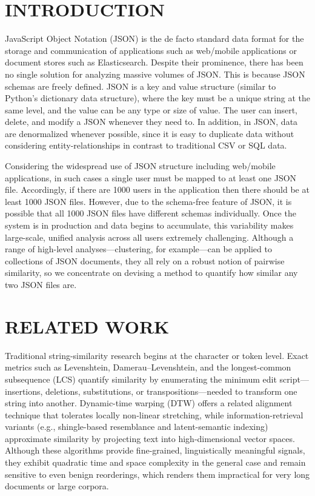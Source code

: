 \documentclass[sigconf]{acmart}
\begin{document}
\maketitle

\section{INTRODUCTION}

JavaScript Object Notation (JSON) is the de facto standard data format for the storage and communication of applications such as web/mobile applications or document stores such as Elasticsearch. Despite their prominence, there has been no single solution for analyzing massive volumes of JSON. This is because JSON schemas are freely defined. JSON is a key and value structure (similar to Python's dictionary data structure), where the key must be a unique string at the same level, and the value can be any type or size of value. The user can insert, delete, and modify a JSON whenever they need to. In addition, in JSON, data are denormalized whenever possible, since it is easy to duplicate data without considering entity-relationships in contrast to traditional CSV or SQL data. 

Considering the widespread use of JSON structure including web/mobile applications, in such cases a single user must be mapped to at least one JSON file. Accordingly, if there are 1000 users in the application then there should be at least 1000 JSON files. However, due to the schema-free feature of JSON, it is possible that all 1000 JSON files have different schemas individually. Once the system is in production and data begins to accumulate, this variability makes large-scale, unified analysis across all users extremely challenging. Although a range of high-level analyses—clustering, for example—can be applied to collections of JSON documents, they all rely on a robust notion of pairwise similarity, so we concentrate on devising a method to quantify how similar any two JSON files are.

\section{RELATED WORK}
Traditional string-similarity research begins at the character or token level. Exact metrics such as Levenshtein, Damerau–Levenshtein, and the longest-common subsequence (LCS) quantify similarity by enumerating the minimum edit script—insertions, deletions, substitutions, or transpositions—needed to transform one string into another. Dynamic-time warping (DTW) offers a related alignment technique that tolerates locally non-linear stretching, while information-retrieval variants (e.g., shingle-based resemblance and latent-semantic indexing) approximate similarity by projecting text into high-dimensional vector spaces. Although these algorithms provide fine-grained, linguistically meaningful signals, they exhibit quadratic time and space complexity in the general case and remain sensitive to even benign reorderings, which renders them impractical for very long documents or large corpora.
\end{document}
